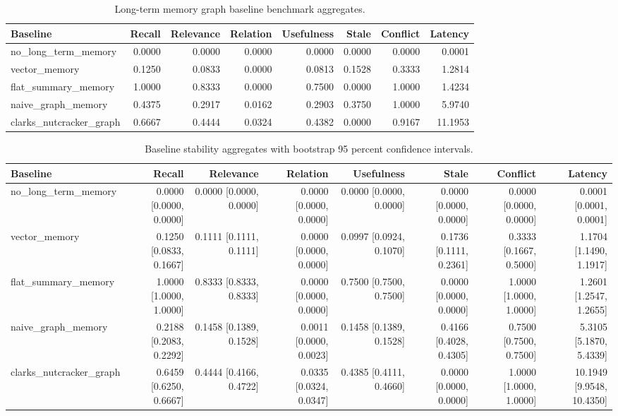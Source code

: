 \begin{table}[t]
\centering
\caption{Long-term memory graph baseline benchmark aggregates.}
\label{tab:ltmg-baseline-aggregate}
\begin{tabular}{lrrrrrrr}
\hline
Baseline & Recall & Relevance & Relation & Usefulness & Stale & Conflict & Latency \\
\hline
no\_long\_term\_memory & 0.0000 & 0.0000 & 0.0000 & 0.0000 & 0.0000 & 0.0000 & 0.0001 \\
vector\_memory & 0.1250 & 0.0833 & 0.0000 & 0.0813 & 0.1528 & 0.3333 & 1.2814 \\
flat\_summary\_memory & 1.0000 & 0.8333 & 0.0000 & 0.7500 & 0.0000 & 1.0000 & 1.4234 \\
naive\_graph\_memory & 0.4375 & 0.2917 & 0.0162 & 0.2903 & 0.3750 & 1.0000 & 5.9740 \\
clarks\_nutcracker\_graph & 0.6667 & 0.4444 & 0.0324 & 0.4382 & 0.0000 & 0.9167 & 11.1953 \\
\hline
\end{tabular}
\end{table}


\begin{table}[t]
\centering
\caption{Baseline stability aggregates with bootstrap 95 percent confidence intervals.}
\label{tab:ltmg-stability-aggregate}
\begin{tabular}{lrrrrrrr}
\hline
Baseline & Recall & Relevance & Relation & Usefulness & Stale & Conflict & Latency \\
\hline
no\_long\_term\_memory & 0.0000 [0.0000, 0.0000] & 0.0000 [0.0000, 0.0000] & 0.0000 [0.0000, 0.0000] & 0.0000 [0.0000, 0.0000] & 0.0000 [0.0000, 0.0000] & 0.0000 [0.0000, 0.0000] & 0.0001 [0.0001, 0.0001] \\
vector\_memory & 0.1250 [0.0833, 0.1667] & 0.1111 [0.1111, 0.1111] & 0.0000 [0.0000, 0.0000] & 0.0997 [0.0924, 0.1070] & 0.1736 [0.1111, 0.2361] & 0.3333 [0.1667, 0.5000] & 1.1704 [1.1490, 1.1917] \\
flat\_summary\_memory & 1.0000 [1.0000, 1.0000] & 0.8333 [0.8333, 0.8333] & 0.0000 [0.0000, 0.0000] & 0.7500 [0.7500, 0.7500] & 0.0000 [0.0000, 0.0000] & 1.0000 [1.0000, 1.0000] & 1.2601 [1.2547, 1.2655] \\
naive\_graph\_memory & 0.2188 [0.2083, 0.2292] & 0.1458 [0.1389, 0.1528] & 0.0011 [0.0000, 0.0023] & 0.1458 [0.1389, 0.1528] & 0.4166 [0.4028, 0.4305] & 0.7500 [0.7500, 0.7500] & 5.3105 [5.1870, 5.4339] \\
clarks\_nutcracker\_graph & 0.6459 [0.6250, 0.6667] & 0.4444 [0.4166, 0.4722] & 0.0335 [0.0324, 0.0347] & 0.4385 [0.4111, 0.4660] & 0.0000 [0.0000, 0.0000] & 1.0000 [1.0000, 1.0000] & 10.1949 [9.9548, 10.4350] \\
\hline
\end{tabular}
\end{table}


